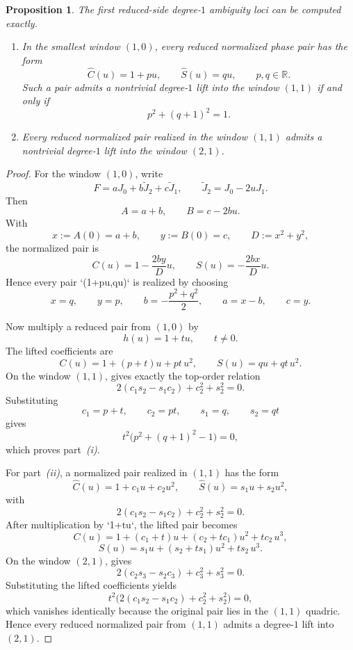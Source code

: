 \documentclass[11pt,reqno]{amsart}
\newtheorem{proposition}[theorem]{Proposition}
\theoremstyle{definition}
\newcommand{\R}{\mathbb{R}}
\begin{document}
\begin{proposition}\label{prop:small-window-incidence}
The first reduced-side degree-$1$ ambiguity loci can be computed exactly.
\begin{enumerate}[label=\emph{(\roman*)}]
\item In the smallest window $(1,0)$, every reduced normalized phase pair has the form
\[
\widehat C(u)=1+pu,
\qquad
\widehat S(u)=qu,
\qquad
p,q\in\R.
\]
Such a pair admits a nontrivial degree-$1$ lift into the window $(1,1)$ if and only if
\[
p^2+(q+1)^2=1.
\]
\item Every reduced normalized pair realized in the window $(1,1)$ admits a nontrivial
degree-$1$ lift into the window $(2,1)$.
\end{enumerate}
\end{proposition}

\begin{proof}
For the window $(1,0)$, write
\[
F=aJ_0+b\widetilde J_2+c\widetilde J_1,
\qquad
\widetilde J_2=J_0-2uJ_1.
\]
Then
\[
A=a+b,
\qquad
B=c-2bu.
\]
With
\[
x:=A(0)=a+b,
\qquad
y:=B(0)=c,
\qquad
D:=x^2+y^2,
\]
the normalized pair is
\[
C(u)=1-\frac{2by}{D}u,
\qquad
S(u)=-\frac{2bx}{D}u.
\]
Hence every pair `(1+pu,qu)` is realized by choosing
\[
x=q,\qquad y=p,\qquad b=-\frac{p^2+q^2}{2},\qquad a=x-b,\qquad c=y.
\]

Now multiply a reduced pair from $(1,0)$ by
\[
h(u)=1+tu,
\qquad
t\neq 0.
\]
The lifted coefficients are
\[
C(u)=1+(p+t)u+pt\,u^2,
\qquad
S(u)=qu+qt\,u^2.
\]
On the window $(1,1)$,  gives exactly the top-order relation
\[
2(c_1s_2-s_1c_2)+c_2^2+s_2^2=0.
\]
Substituting
\[
c_1=p+t,\qquad c_2=pt,\qquad s_1=q,\qquad s_2=qt
\]
gives
\[
t^2\bigl(p^2+(q+1)^2-1\bigr)=0,
\]
which proves part~\emph{(i)}.

For part~\emph{(ii)}, a normalized pair realized in $(1,1)$ has the form
\[
\widehat C(u)=1+c_1u+c_2u^2,
\qquad
\widehat S(u)=s_1u+s_2u^2,
\]
with
\[
2(c_1s_2-s_1c_2)+c_2^2+s_2^2=0.
\]
After multiplication by `1+tu`, the lifted pair becomes
\[
C(u)=1+(c_1+t)u+(c_2+tc_1)u^2+tc_2\,u^3,
\]
\[
S(u)=s_1u+(s_2+ts_1)u^2+ts_2\,u^3.
\]
On the window $(2,1)$,  gives
\[
2(c_2s_3-s_2c_3)+c_3^2+s_3^2=0.
\]
Substituting the lifted coefficients yields
\[
t^2\bigl(2(c_1s_2-s_1c_2)+c_2^2+s_2^2\bigr)=0,
\]
which vanishes identically because the original pair lies in the $(1,1)$ quadric. Hence every
reduced normalized pair from $(1,1)$ admits a degree-$1$ lift into $(2,1)$.
\end{proof}
\end{document}
